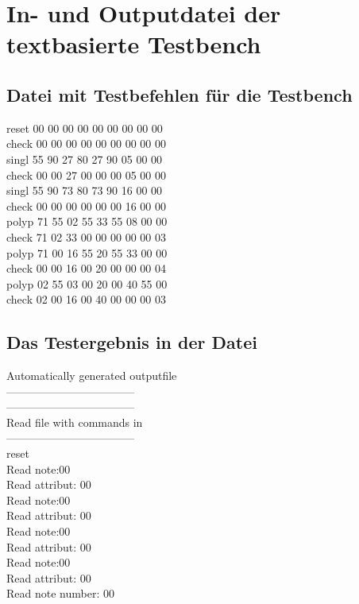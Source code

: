 \chapter{In- und Outputdatei der textbasierte Testbench}\label{chap.anhang_midi_input}

\section*{Datei mit Testbefehlen für die Testbench}
reset 00 00 00 00 00 00 00 00 00\\
check 00 00 00 00 00 00 00 00 00\\
singl 55 90 27 80 27 90 05 00 00\\
check 00 00 27 00 00 00 05 00 00\\
singl 55 90 73 80 73 90 16 00 00\\
check 00 00 00 00 00 00 16 00 00\\
polyp 71 55 02 55 33 55 08 00 00\\
check 71 02 33 00 00 00 00 00 03\\
polyp 71 00 16 55 20 55 33 00 00\\
check 00 00 16 00 20 00 00 00 04\\
polyp 02 55 03 00 20 00 40 55 00\\
check 02 00 16 00 40 00 00 00 03\\

\section*{Das Testergebnis in der Datei}
Automatically generated outputfile\\
-----------------------------------\\
-----------------------------------\\


Read file with commands in\\
-----------------------------------\\
reset\\
Read note:00\\
Read attribut: 00\\
Read note:00\\
Read attribut: 00\\
Read note:00\\
Read attribut: 00\\
Read note:00\\
Read attribut: 00\\
Read note number: 00\\

